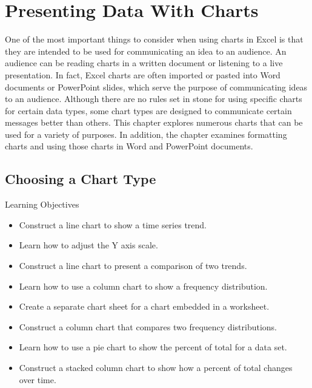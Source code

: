 \chapter{Presenting Data With Charts}\label{ch04:charts}

One of the most important things to consider when using charts in Excel is that they are intended to be used for communicating an idea to an audience. An audience can be reading charts in a written document or listening to a live presentation. In fact, Excel charts are often imported or pasted into Word documents or PowerPoint slides, which serve the purpose of communicating ideas to an audience. Although there are no rules set in stone for using specific charts for certain data types, some chart types are designed to communicate certain messages better than others. This chapter explores numerous charts that can be used for a variety of purposes. In addition, the chapter examines formatting charts and using those charts in Word and PowerPoint documents.

\section{Choosing a Chart Type}

\begin{center}
	\begin{objbox}{Learning Objectives}
		\begin{itemize}
			\setlength{\itemsep}{0pt}
			\setlength{\parskip}{0pt}
			\setlength{\parsep}{0pt}

			\item Construct a line chart to show a time series trend.
			\item Learn how to adjust the Y axis scale.
			\item Construct a line chart to present a comparison of two trends.
			\item Learn how to use a column chart to show a frequency distribution.
			\item Create a separate chart sheet for a chart embedded in a worksheet.
			\item Construct a column chart that compares two frequency distributions.
			\item Learn how to use a pie chart to show the percent of total for a data set.
			\item Construct a stacked column chart to show how a percent of total changes over time.
			
		\end{itemize}
	\end{objbox}
\end{center}

